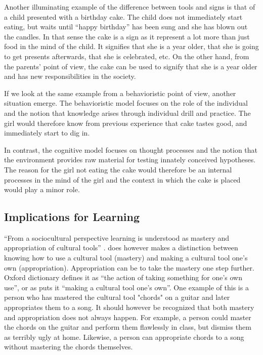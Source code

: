 Another illuminating example of the difference between tools and signs is that of a child presented with a birthday cake. The child does not immediately start eating, but waits until “happy birthday” has been sung and she has blown out the candles. In that sense the cake is a sign as it represent a lot more than just food in the mind of the child. It signifies that she is a year older, that she is going to get presents afterwards, that she is celebrated, etc. On the other hand, from the parents’ point of view, the cake can be used to signify that she is a year older and has new responsibilities in the society. 

If we look at the same example from a behavioristic point of view, another situation emerge. The behavioristic model focuses on the role of the individual and the notion that knowledge arises through individual drill and practice. The girl would therefore know from previous experience that cake tastes good, and immediately start to dig in. 

In contrast, the cognitive model focuses on thought processes and the notion that the environment provides raw material for testing innately conceived hypotheses. The reason for the girl not eating the cake would therefore be an internal processes in the mind of the girl and the context in which the cake is placed would play a minor role. 

\subsection{Implications for Learning}
“From a sociocultural perspective learning is understood as mastery and appropriation of cultural tools” \citetext{Wertsch, 1998, Säljö, 1999, 2001, cited in \citealp{mifsud2010reconsidering}}. \citet{wertsch1998mind} does however makes a distinction between knowing how to use a cultural tool (mastery) and making a cultural tool one’s own (appropriation). Appropriation can be to take the mastery one step further. Oxford dictionary defines it as “the action of taking something for one’s own use”, or as \citet{wertsch1998mind} puts it “making a cultural tool one’s own”. One example of this is a person who has mastered the cultural tool "chords" on a guitar and later appropriates them to a song. It should however be recognized that both mastery and appropriation does not always happen. For example, a person could master the chords on the guitar and perform them flawlessly in class, but dismiss them as terribly ugly at home. Likewise, a person can appropriate chords to a song without mastering the chords themselves.

